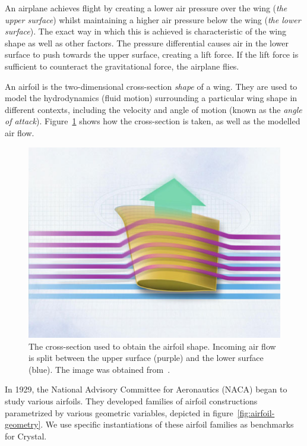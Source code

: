 An airplane achieves flight by creating a lower air pressure over the wing (\emph{the upper surface}) whilst maintaining a higher air pressure below the wing (\emph{the lower surface}). The exact way in which this is achieved is characteristic of the wing shape as well as other factors. The pressure differential causes air in the lower surface to push towards the upper surface, creating a lift force. If the lift force is sufficient to counteract the gravitational force, the airplane flies.

An airfoil is the two-dimensional cross-section \emph{shape} of a wing. They are used to model the hydrodynamics (fluid motion) surrounding a particular wing shape in different contexts, including the velocity and angle of motion (known as the \emph{angle of attack}). Figure~\ref{fig:airfoil-crosscut} shows how the cross-section is taken, as well as the modelled air flow.

\begin{figure}
\includegraphics[width=\imagewidth]{images/background/airfoil_crosscut.jpg}
    \caption{The cross-section used to obtain the airfoil shape. Incoming air flow is split between the upper surface (purple) and the lower surface (blue). The image was obtained from~\cite{boeing2014airfoil}.}
    \label{fig:airfoil-crosscut}
\end{figure}


In 1929, the National Advisory Committee for Aeronautics (NACA) began to study various airfoils. They developed families of airfoil constructions parametrized by various geometric variables, depicted in figure~\ref{fig:airfoil-geometry}. We use specific instantiations of these airfoil families as benchmarks for Crystal.

